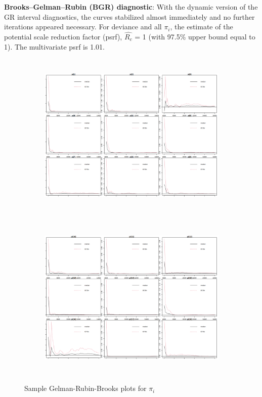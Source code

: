 \documentclass[12pt]{article}
\begin{document}
\textbf{Brooks–Gelman–Rubin (BGR) diagnostic}: With the dynamic version of the GR interval diagnostics, the curves stabilized almost immediately and no further iterations appeared necessary. For deviance and all $\pi_i$, the estimate of the potential scale reduction factor (psrf), $\hat{R_c}$ = 1 (with 97.5\% upper bound equal to 1). The multivariate psrf is 1.01.

\begin{figure}[h!]
    \centering
    \begin{subfigure}{0.45\textwidth}
        \includegraphics[width=\linewidth, height=8cm]{pictures/GRB1.png}
    \end{subfigure}
    \begin{subfigure}{0.45\textwidth}
        \includegraphics[width=\linewidth, height=8cm]{pictures/GRB2.png}
    \end{subfigure}
    
    \caption{Sample Gelman-Rubin-Brooks plots for $\pi_i$}
    \label{fig:GRBm1}
\end{figure}
\FloatBarrier %
\end{document}
